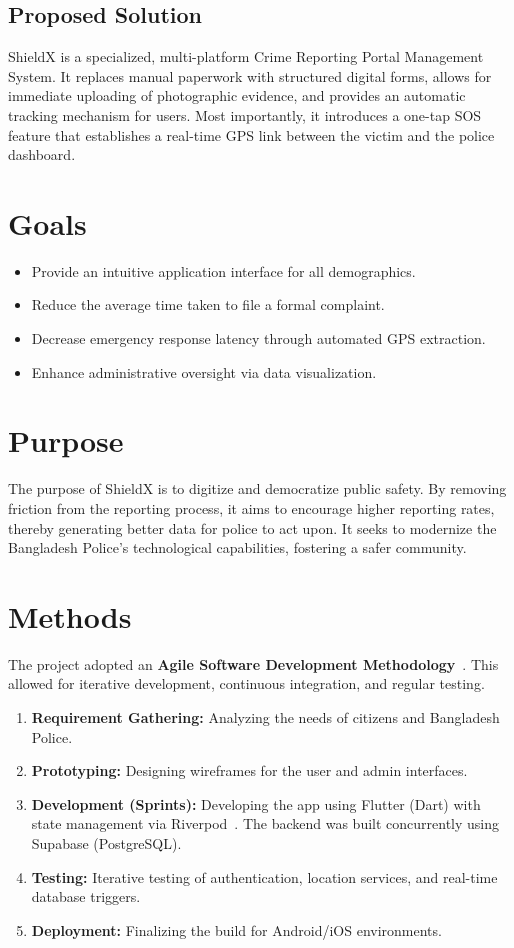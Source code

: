 \documentclass[12pt, a4paper, twoside]{report}
\begin{document}
\subsection{Proposed Solution}
ShieldX is a specialized, multi-platform Crime Reporting Portal Management System. It replaces manual paperwork with structured digital forms, allows for immediate uploading of photographic evidence, and provides an automatic tracking mechanism for users. Most importantly, it introduces a one-tap SOS feature that establishes a real-time GPS link between the victim and the police dashboard.

\section{Goals}
\begin{itemize}
    \item Provide an intuitive application interface for all demographics.
    \item Reduce the average time taken to file a formal complaint.
    \item Decrease emergency response latency through automated GPS extraction.
    \item Enhance administrative oversight via data visualization.
\end{itemize}

\section{Purpose}
The purpose of ShieldX is to digitize and democratize public safety. By removing friction from the reporting process, it aims to encourage higher reporting rates, thereby generating better data for police to act upon. It seeks to modernize the Bangladesh Police's technological capabilities, fostering a safer community.

\section{Methods}
The project adopted an \textbf{Agile Software Development Methodology}~\cite{agile}. This allowed for iterative development, continuous integration, and regular testing.
\begin{enumerate}
    \item[] \textbf{Requirement Gathering:} Analyzing the needs of citizens and Bangladesh Police.
    \item[] \textbf{Prototyping:} Designing wireframes for the user and admin interfaces.
    \item[] \textbf{Development (Sprints):} Developing the app using Flutter (Dart) with state management via Riverpod~\cite{riverpod}. The backend was built concurrently using Supabase (PostgreSQL).
    \item[] \textbf{Testing:} Iterative testing of authentication, location services, and real-time database triggers.
    \item[] \textbf{Deployment:} Finalizing the build for Android/iOS environments.
\end{enumerate}
\end{document}
